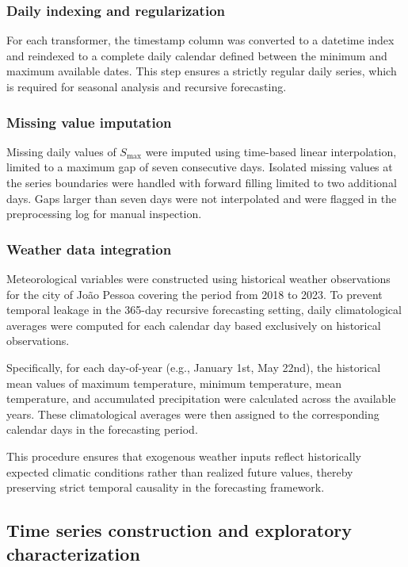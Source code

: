 \subsubsection{Daily indexing and regularization}
For each transformer, the timestamp column was converted to a datetime index and reindexed to a complete daily calendar defined between the minimum and maximum available dates. This step ensures a strictly regular daily series, which is required for seasonal analysis and recursive forecasting.

\subsubsection{Missing value imputation}
Missing daily values of $S_{\max}$ were imputed using time-based linear interpolation, limited to a maximum gap of seven consecutive days. Isolated missing values at the series boundaries were handled with forward filling limited to two additional days. Gaps larger than seven days were not interpolated and were flagged in the preprocessing log for manual inspection.

\subsubsection{Weather data integration}

Meteorological variables were constructed using historical weather observations for the city of João Pessoa covering the period from 2018 to 2023. To prevent temporal leakage in the 365-day recursive forecasting setting, daily climatological averages were computed for each calendar day based exclusively on historical observations.

Specifically, for each day-of-year (e.g., January 1st, May 22nd), the historical mean values of maximum temperature, minimum temperature, mean temperature, and accumulated precipitation were calculated across the available years. These climatological averages were then assigned to the corresponding calendar days in the forecasting period.

This procedure ensures that exogenous weather inputs reflect historically expected climatic conditions rather than realized future values, thereby preserving strict temporal causality in the forecasting framework.


\subsection{Time series construction and exploratory characterization}
\label{subsec:ts_construction}

